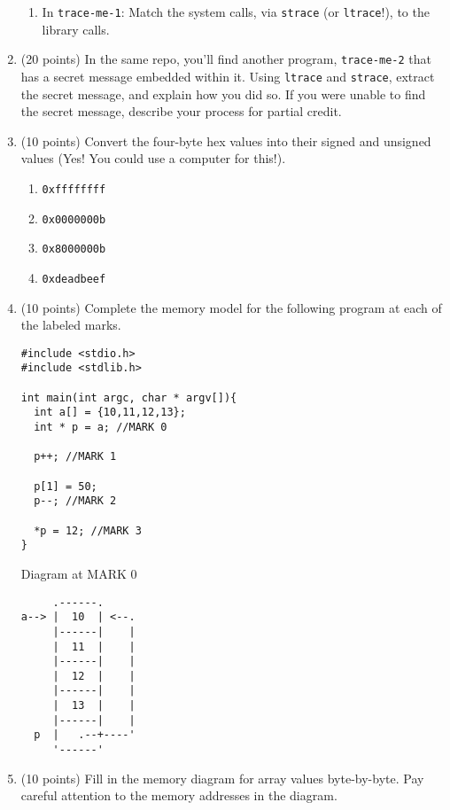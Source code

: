 \documentclass{article}[9pt]
\begin{document}
\begin{enumerate}
\begin{enumerate}
\item In \texttt{trace-me-1}: Match the system calls, via \texttt{strace} (or \texttt{ltrace}!), to the library calls.
\end{enumerate}

\item (20 points) In the same repo, you'll find another program,
\texttt{trace-me-2} that has a secret message embedded within it. Using
\texttt{ltrace} and \texttt{strace}, extract the secret message, and explain
how you did so. If you were unable to find the secret message,
describe your process for partial credit.

\item (10 points) Convert the four-byte hex values into their signed and unsigned
values (Yes! You could use a computer for this!).

\begin{enumerate}
\item \texttt{0xffffffff}

\item \texttt{0x0000000b}

\item \texttt{0x8000000b}

\item \texttt{0xdeadbeef}
\end{enumerate}

\item (10 points) Complete the memory model for the following program at each of the labeled marks.
\begin{verbatim}
#include <stdio.h>
#include <stdlib.h>

int main(int argc, char * argv[]){
  int a[] = {10,11,12,13};
  int * p = a; //MARK 0

  p++; //MARK 1

  p[1] = 50;
  p--; //MARK 2

  *p = 12; //MARK 3
}
\end{verbatim}

Diagram at MARK 0
\begin{verbatim}
     .------.
a--> |  10  | <--.
     |------|    |
     |  11  |    |
     |------|    |
     |  12  |    |
     |------|    |
     |  13  |    | 
     |------|    | 
  p  |   .--+----'         
     '------'
\end{verbatim}

\item (10 points) Fill in the memory diagram for array values byte-by-byte. Pay
careful attention to the memory addresses in the diagram.


\end{enumerate}
\end{document}
